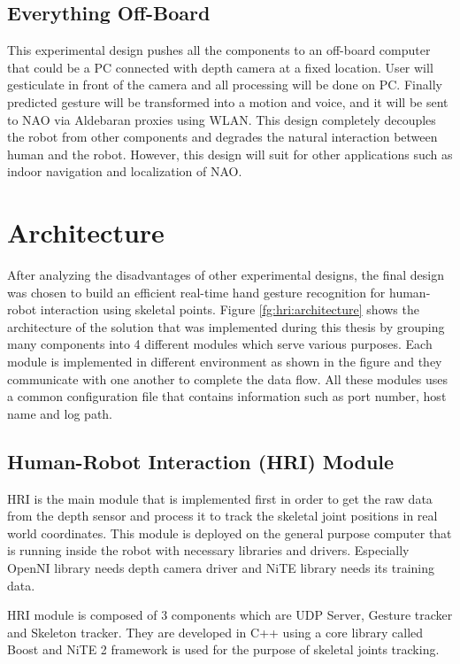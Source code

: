 

\subsection{Everything Off-Board} This experimental design pushes all the components to an off-board computer that could be a PC connected with depth camera at a fixed location. User will gesticulate in front of the camera and all processing will be done on PC. Finally predicted gesture will be transformed into a motion and voice, and it will be sent to NAO via Aldebaran proxies using WLAN. This design completely decouples the robot from other components and degrades the natural interaction between human and the robot. However, this design will suit for other applications such as indoor navigation and localization of NAO.

\section{Architecture } After analyzing the disadvantages of other experimental designs, the final design was chosen to build an efficient real-time hand gesture recognition for human-robot interaction using skeletal points. Figure \ref{fg:hri:architecture} shows the architecture of the solution that was implemented during this thesis by grouping many components into 4 different modules which serve various purposes. Each module is implemented in different environment as shown in the figure and they communicate with one another to complete the data flow. All these modules uses a common configuration file that contains information such as port number, host name and log path.



\subsection{Human-Robot Interaction (HRI) Module} HRI is the main module that is implemented first in order to get the raw data from the depth sensor and process it to track the skeletal joint positions in real world coordinates. This module is deployed on the general purpose computer that is running inside the robot with necessary libraries and drivers. Especially OpenNI library needs depth camera driver and NiTE library needs its training data.

HRI module is composed of 3 components which are UDP Server, Gesture tracker and Skeleton tracker. They are developed in C++ using a core library called Boost and NiTE 2 framework is used for the purpose of skeletal joints tracking.

